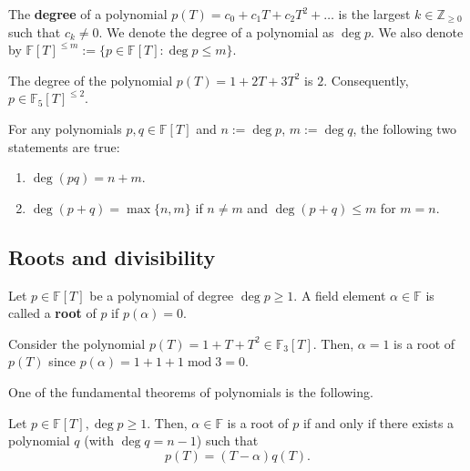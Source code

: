 \documentclass[../../book.tex]{subfiles}
\begin{document}
\vspace{-4mm}

\begin{definition}
    The \textbf{degree} of a polynomial $p(T) = c_0+c_1T+c_2T^2+\dots$ is the largest $k \in \mathbb{Z}_{\geq 0}$ such that $c_k \neq 0$. We denote the degree of a polynomial as $\deg p$. We also denote by $\mathbb{F}[T]^{\leq m} := \{p \in \mathbb{F}[T]: \deg p \leq m\}$.
\end{definition}

\begin{example}
    The degree of the polynomial $p(T) = 1 + 2T + 3T^2$ is $2$. Consequently, $p \in
    \mathbb{F}_5[T]^{\leq 2}$.
\end{example}

\begin{theorem}
    For any polynomials $p,q \in \mathbb{F}[T]$ and $n := \deg p$, $m := \deg q$, the following two statements are true:
    \begin{enumerate}
        \item $\deg (pq) = n + m$.
        \item $\deg (p + q) = \max\{n,m\}$ if $n \neq m$ and $\deg (p+q) \leq m$ for $m=n$.
    \end{enumerate}
\end{theorem}

\subsection{Roots and divisibility}

\begin{definition}
    Let $p \in \mathbb{F}[T]$ be a polynomial of degree $\deg p \geq 1$. A field element $\alpha \in \mathbb{F}$ is called a \textbf{root} of $p$ if $p(\alpha) = 0$.
\end{definition}

\vspace{-4mm}

\begin{example}
    Consider the polynomial $p(T) = 1 + T + T^2 \in \mathbb{F}_3[T]$. Then, $\alpha=1$ is a root of $p(T)$ since $p(\alpha) = 1 + 1 + 1 \; \text{mod} \; 3 = 0$.
\end{example}

One of the fundamental theorems of polynomials is the following.

\begin{theorem}\label{th:root-div}
    Let $p \in \mathbb{F}[T], \deg p \geq 1$. Then, $\alpha \in \mathbb{F}$ is a root of $p$ if and only if there exists a polynomial $q$ (with $\deg q=n-1$) such that
    \begin{equation*}
        p(T) = (T-\alpha)q(T).
    \end{equation*}
\end{theorem}
\end{document}
